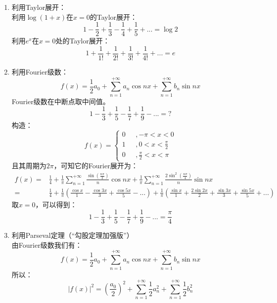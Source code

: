 \begin{enumerate}
	\item 
		利用Taylor展开：\\
		利用$\log (1+x)$在$x=0$的Taylor展开：
		\begin{equation}
		1-\frac{1}{2}+\frac{1}{3}-\frac{1}{4}+\frac{1}{5}+... = \log 2
		\end{equation}
		利用$e^x$在$x=0$处的Taylor展开：
		\begin{equation}
		1+\frac{1}{1!}+\frac{1}{2!}+\frac{1}{3!}+\frac{1}{4!}+... = e
		\end{equation}
	\item 利用Fourier级数：
		\begin{equation}
		f(x) = \frac{1}{2}a_0+\sum_{n=1}^{+\infty}a_n \cos nx+\sum_{n=1}^{+\infty}b_n \sin nx
		\end{equation}
		Fourier级数在中断点取中间值。
		\[1-\frac{1}{3}+\frac{1}{5}-\frac{1}{7}+\frac{1}{9}-... = ?\]
		构造：
		\[f(x) = \left\{
		\begin{array}{ll}
		0 &\ \ \  ,         -\pi < x < 0\\
		1 &\ \ \  ,            0 < x < \frac{\pi}{2}\\
		0 &\ \ \  ,\frac{\pi}{2} < x < \pi
		\end{array}
		\right.\]
		且其周期为$2\pi$，可知它的Fourier展开为：
	    \[
	    \begin{split}
	    f(x) =& \frac{1}{4} + \frac{1}{\pi} \sum_{n=1}^{+\infty} \frac{\sin \left(\frac{n\pi}{2}\right)}{n} \cos nx + \frac{1}{\pi} \sum_{n=1}^{+\infty} \frac{2 \sin ^2\left(\frac{n\pi}{4}\right)}{n} \sin nx\\
	    =& \frac{1}{4}+\frac{1}{\pi}\left(\frac{\cos x}{1}-\frac{\cos 3x}{3}+\frac{\cos 5x}{5}-...\right)+\frac{1}{\pi}\left(\frac{\sin x}{1}+\frac{2 \sin 2x}{2}+\frac{\sin 3x}{3}+\frac{\sin 5x}{5}+...\right)
	    \end{split}
	    \]
	    取$x=0$，可以得到：
	    \begin{equation}
	    1-\frac{1}{3}+\frac{1}{5}-\frac{1}{7}+\frac{1}{9}-... = \frac{\pi}{4}
	    \end{equation}
    \item
	    利用Parseval定理（“勾股定理加强版”）\\
	    由Fourier级数我们有：
	    \[f(x) = \frac{1}{2}a_0+\sum_{n=1}^{+\infty}a_n \cos nx+\sum_{n=1}^{+\infty} b_n \sin nx\]
	    所以：
	    \begin{equation}
	    \left|f(x)\right|^2 = \left(\frac{a_0}{2}\right)^2+\sum_{n=1}^{+\infty}\frac{1}{2}a_n^2+\sum_{n=1}^{+\infty}\frac{1}{2}b_n^2

\end{equation}
\end{enumerate}
